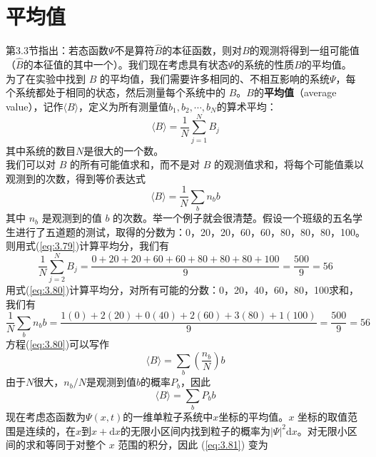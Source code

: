 \section{平均值}
\label{sec:3.7 Average Values}
	第3.3节指出：若态函数$\Psi$不是算符$\hat{B}$的本征函数，则对$B$的观测将得到一组可能值（$\hat{B}$的本征值的其中一个）。我们现在考虑具有状态$\Psi$的系统的性质$B$的平均值。\\
	\indent 为了在实验中找到 $B$ 的平均值，我们需要许多相同的、不相互影响的系统$\Psi$，每个系统都处于相同的状态，然后测量每个系统中的 $B$。$B$的\textbf{平均值}（average value），记作$\langle B \rangle$，定义为所有测量值$b_1,b_2,\cdots,b_N$的算术平均：
	\begin{equation}
		\langle B \rangle = \frac{1}{N}\sum_{j=1}^{N}B_j
		\label{eq:3.79}
	\end{equation}
	其中系统的数目$N$是很大的一个数。\\
	\indent 我们可以对 $B$ 的所有可能值求和，而不是对 $B$ 的观测值求和，将每个可能值乘以观测到的次数，得到等价表达式
	\begin{equation}
		\langle B \rangle = \frac{1}{N}\sum_{b}n_bb
		\label{eq:3.80}
	\end{equation}
	其中 $n_b$ 是观测到的值 $b$ 的次数。举一个例子就会很清楚。假设一个班级的五名学生进行了五道题的测试，取得的分数为：0，20，20，60，60，80，80，80，100。则用式(\ref{eq:3.79})计算平均分，我们有
	\begin{equation*}
		\frac{1}{N}\sum_{j=2}^{N}B_j = \frac{0+20+20+60+60+80+80+80+100}{9} = \frac{500}{9} = 56
	\end{equation*}
	用式(\ref{eq:3.80})计算平均分，对所有可能的分数：0，20，40，60，80，100求和，我们有
	\begin{equation*}
		\frac{1}{N}\sum_{b}n_bb = \frac{1\left(0\right)+2\left(20\right)+0\left(40\right)+2\left(60\right)+3\left(80\right)+1\left(100\right)}{9} = \frac{500}{9} = 56
	\end{equation*}
	\indent 方程(\ref{eq:3.80})可以写作
	\begin{equation*}
		\langle B \rangle = \sum_{b}\left(\frac{n_b}{N}\right)b
	\end{equation*}
	由于$N$很大，$n_b/N$是观测到值$b$的概率$P_b$，因此
	\begin{equation}
		\langle B \rangle = \sum_{b}P_bb
		\label{eq:3.81}
	\end{equation}
	\indent 现在考虑态函数为$\Psi\left(x,t\right)$的一维单粒子系统中$x$坐标的平均值。$x$ 坐标的取值范围是连续的，在$x$到$x+\mathrm{d}x$的无限小区间内找到粒子的概率为$\left|\Psi\right|^2\mathrm{d}x$。对无限小区间的求和等同于对整个 $x$ 范围的积分，因此 (\ref{eq:3.81}) 变为
